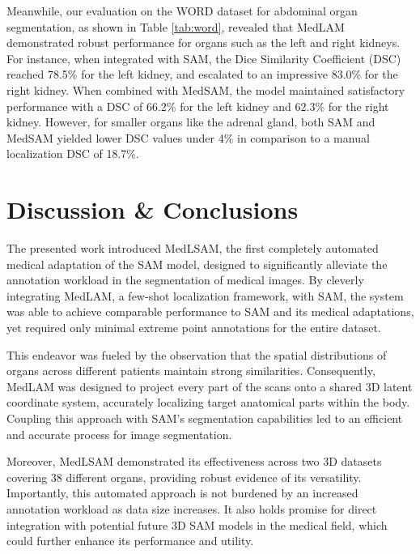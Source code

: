 \documentclass[a4paper]{llncs}
\begin{document}
Meanwhile, our evaluation on the WORD dataset for abdominal organ segmentation, as shown in Table \ref{tab:word}, revealed that MedLAM demonstrated robust performance for organs such as the left and right kidneys. For instance, when integrated with SAM, the Dice Similarity Coefficient (DSC) reached 78.5\% for the left kidney, and escalated to an impressive 83.0\% for the right kidney. When combined with MedSAM, the model maintained satisfactory performance with a DSC of 66.2\% for the left kidney and 62.3\% for the right kidney. However, for smaller organs like the adrenal gland, both SAM and MedSAM yielded lower DSC values under 4\% in comparison to a manual localization DSC of 18.7\%. 

\section{Discussion \& Conclusions}
The presented work introduced MedLSAM, the first completely automated medical adaptation of the SAM model, designed to significantly alleviate the annotation workload in the segmentation of medical images. By cleverly integrating MedLAM, a few-shot localization framework, with SAM, the system was able to achieve comparable performance to SAM and its medical adaptations, yet required only minimal extreme point annotations for the entire dataset.

This endeavor was fueled by the observation that the spatial distributions of organs across different patients maintain strong similarities. Consequently, MedLAM was designed to project every part of the scans onto a shared 3D latent coordinate system, accurately localizing target anatomical parts within the body. Coupling this approach with SAM's segmentation capabilities led to an efficient and accurate process for image segmentation.

Moreover, MedLSAM demonstrated its effectiveness across two 3D datasets covering 38 different organs, providing robust evidence of its versatility. Importantly, this automated approach is not burdened by an increased annotation workload as data size increases. It also holds promise for direct integration with potential future 3D SAM models in the medical field, which could further enhance its performance and utility.



\end{document}
